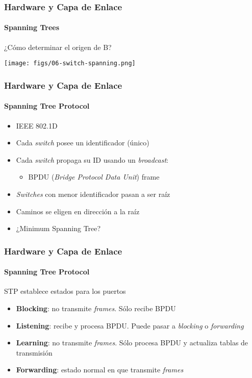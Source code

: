 \documentclass[letter]{beamer}
\begin{document}
\begin{frame}
  \frametitle{Hardware y Capa de Enlace}
  \framesubtitle{Spanning Trees}

  ¿Cómo determinar el origen de B?
  
  \begin{center}
    \texttt{[image: figs/06-switch-spanning.png]}
  \end{center}

\end{frame}

\begin{frame}
  \frametitle{Hardware y Capa de Enlace}
  \framesubtitle{Spanning Tree Protocol}

  \begin{itemize}
    \item IEEE 802.1D
    \item Cada {\em switch} posee un identificador (único)
    \item Cada {\em switch} propaga su ID usando un {\em broadcast}:
      \begin{itemize}
        \item BPDU ({\em Bridge Protocol Data Unit}) frame
      \end{itemize}
    \item {\em Switches} con menor identificador pasan a ser raíz
    \item Caminos se eligen en dirección a la raíz
    \item ¿Minimum Spanning Tree?
  \end{itemize}

\end{frame}

\begin{frame}
  \frametitle{Hardware y Capa de Enlace}
  \framesubtitle{Spanning Tree Protocol}

  STP establece estados para los puertos
  \begin{itemize}
    \item {\bf Blocking}: no transmite {\em frames}. Sólo recibe BPDU
    \item {\bf Listening}: recibe y procesa BPDU. Puede pasar a {\em blocking} o {\em forwarding}
    \item {\bf Learning}: no transmite {\em frames}. Sólo procesa BPDU y actualiza tablas de transmisión
    \item {\bf Forwarding}: estado normal en que transmite {\em frames}
  \end{itemize}

\end{frame}  
\end{document}
